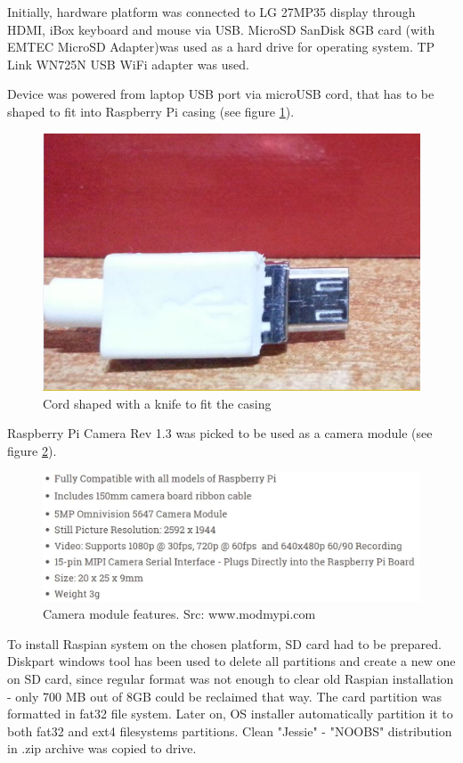 \documentclass[12pt,twoside,a4paper]{article}
\begin{document}
Initially, hardware platform was connected to LG 27MP35 display through HDMI, iBox keyboard and mouse via USB. 
MicroSD SanDisk 8GB card (with EMTEC MicroSD Adapter)was used as a hard drive for operating system. 
TP Link WN725N USB WiFi adapter was used.

Device was powered from laptop USB port via microUSB cord, that has to be shaped to fit into Raspberry Pi casing (see figure \ref{fig:cable}).



\begin{figure}[H]
\centering
\includegraphics[width=0.3\paperwidth]{cable}
\caption{Cord shaped with a knife to fit the casing}\label{fig:cable}
\end{figure}

Raspberry Pi Camera Rev 1.3 was picked to be used as a camera module (see figure \ref{fig:features}). 

\begin{figure}[H]
\centering
\includegraphics[width=0.5\paperwidth]{features}
\caption{Camera module features. Src: www.modmypi.com}\label{fig:features}
\end{figure}

To install Raspian system on the chosen platform, SD card had to be prepared.
Diskpart windows tool has been used to delete all partitions and create a new one on SD card, since regular format was not enough to clear old Raspian installation - only 700 MB out of 8GB could be reclaimed that way.
The card partition was formatted in fat32 file system.
Later on, OS installer automatically partition it to both fat32 and ext4 filesystems partitions.
Clean "Jessie" - "NOOBS" distribution in .zip archive was copied to drive.
\end{document}
